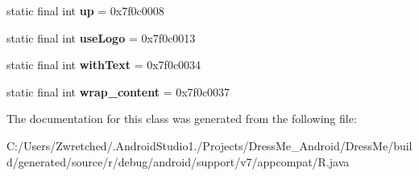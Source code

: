 \begin{DoxyCompactItemize}
\item 
\hypertarget{classandroid_1_1support_1_1v7_1_1appcompat_1_1_r_1_1id_a9aab36bc7e4cb601c12167a3b78ed738}{}static final int {\bfseries up} = 0x7f0c0008\label{classandroid_1_1support_1_1v7_1_1appcompat_1_1_r_1_1id_a9aab36bc7e4cb601c12167a3b78ed738}

\item 
\hypertarget{classandroid_1_1support_1_1v7_1_1appcompat_1_1_r_1_1id_ac5a07dc3f29a06c392e4b93a4a2332dc}{}static final int {\bfseries use\+Logo} = 0x7f0c0013\label{classandroid_1_1support_1_1v7_1_1appcompat_1_1_r_1_1id_ac5a07dc3f29a06c392e4b93a4a2332dc}

\item 
\hypertarget{classandroid_1_1support_1_1v7_1_1appcompat_1_1_r_1_1id_a79f645a98c381481fa7b07b59b850606}{}static final int {\bfseries with\+Text} = 0x7f0c0034\label{classandroid_1_1support_1_1v7_1_1appcompat_1_1_r_1_1id_a79f645a98c381481fa7b07b59b850606}

\item 
\hypertarget{classandroid_1_1support_1_1v7_1_1appcompat_1_1_r_1_1id_a5263ea8cbb699c84a7171895a696e0c1}{}static final int {\bfseries wrap\+\_\+content} = 0x7f0c0037\label{classandroid_1_1support_1_1v7_1_1appcompat_1_1_r_1_1id_a5263ea8cbb699c84a7171895a696e0c1}

\end{DoxyCompactItemize}


The documentation for this class was generated from the following file\+:\begin{DoxyCompactItemize}
\item 
C\+:/\+Users/\+Zwretched/.\+Android\+Studio1./\+Projects/\+Dress\+Me\+\_\+\+Android/\+Dress\+Me/build/generated/source/r/debug/android/support/v7/appcompat/R.\+java\end{DoxyCompactItemize}
